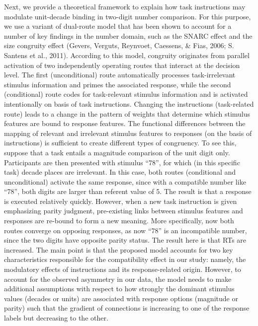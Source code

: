 \documentclass[english,man]{apa6}
\theoremstyle{definition}
\theoremstyle{definition}
\theoremstyle{definition}
\theoremstyle{remark}
\begin{document}
Next, we provide a theoretical framework to explain how task
instructions may modulate unit-decade binding in two-digit number
comparison. For this purpose, we use a variant of dual-route model that
has been shown to account for a number of key findings in the number
domain, such as the SNARC effect and the size congruity effect (Gevers,
Verguts, Reynvoet, Caessens, \& Fias, 2006; S. Santens et al., 2011).
According to this model, congruity originates from parallel activation
of two independently operating routes that interact at the decision
level. The first (unconditional) route automatically processes
task-irrelevant stimulus information and primes the associated response,
while the second (conditional) route codes for task-relevant stimulus
information and is activated intentionally on basis of task
instructions. Changing the instructions (task-related route) leads to a
change in the pattern of weights that determine which stimulus features
are bound to response features. The functional differences between the
mapping of relevant and irrelevant stimulus features to responses (on
the basis of instructions) is sufficient to create different types of
congruency. To see this, suppose that a task entails a magnitude
comparison of the unit digit only. Participants are then presented with
stimulus \enquote{78}, for which (in this specific task) decade places
are irrelevant. In this case, both routes (conditional and
unconditional) activate the same response, since with a compatible
number like \enquote{78}, both digits are larger than referent value of
5. The result is that a response is executed relatively quickly.
However, when a new task instruction is given emphasizing parity
judgment, pre-existing links between stimulus features and responses are
re-bound to form a new meaning. More specifically, now both routes
converge on opposing responses, as now \enquote{78} is an incompatible
number, since the two digits have opposite parity status. The result
here is that RTs are increased. The main point is that the proposed
model accounts for two key characteristics responsible for the
compatibility effect in our study: namely, the modulatory effects of
instructions and its response-related origin. However, to account for
the observed asymmetry in our data, the model needs to make additional
assumptions with respect to how strongly the dominant stimulus values
(decades or units) are associated with response options (magnitude or
parity) such that the gradient of connections is increasing to one of
the response labels but decreasing to the other.
\end{document}
